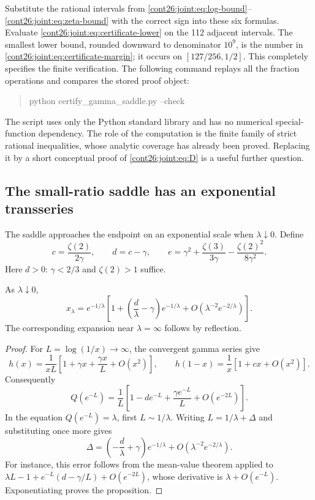 Substitute the rational intervals from
\eqref{cont26:joint:eq:log-bound}--\eqref{cont26:joint:eq:zeta-bound} with the correct
sign into these six formulas.  Evaluate
\eqref{cont26:joint:eq:certificate-lower} on the 112 adjacent intervals.
The smallest lower bound, rounded downward to denominator $10^9$,
is the number in \eqref{cont26:joint:eq:certificate-margin}; it occurs on
$[127/256,1/2]$.  This completely specifies the finite verification.
The following command replays all the fraction operations and compares
the stored proof object:
\begin{quote}\ttfamily
 python certify\_gamma\_saddle.py --check
\end{quote}
The script uses only the Python standard library and has no numerical
special-function dependency.  The role of the computation is the
finite family of strict rational inequalities, whose analytic coverage
has already been proved.  Replacing it by a short conceptual proof of
\eqref{cont26:joint:eq:D} is a useful further question.

\subsection{The small-ratio saddle has an exponential transseries}

The saddle approaches the endpoint on an exponential scale when
$\lambda\downarrow0$.  Define
\begin{equation}\label{cont26:joint:eq:cde}
 c=\frac{\zeta(2)}{2\gamma},\qquad d=c-\gamma,\qquad
 e=\gamma^2+\frac{\zeta(3)}{3\gamma}
                   -\frac{\zeta(2)^2}{8\gamma^2}.
\end{equation}
Here $d>0$: $\gamma<2/3$ and $\zeta(2)>1$ suffice.

\begin{proposition}
\label{cont26:joint:prop:saddle-small}
As $\lambda\downarrow0$,
\begin{equation}\label{cont26:joint:eq:saddle-small}
 x_\lambda=e^{-1/\lambda}
 \left[1+\left(\frac d\lambda-\gamma\right)e^{-1/\lambda}
 +O\left(\lambda^{-2}e^{-2/\lambda}\right)\right].
\end{equation}
The corresponding expansion near $\lambda=\infty$ follows by reflection.
\end{proposition}
\begin{proof}
For $L=\log(1/x)\to\infty$, the convergent gamma series give
\[
 h(x)=\frac1{xL}\left[1+\gamma x+\frac{\gamma x}L+O(x^2)\right],
 \qquad h(1-x)=\frac1x[1+cx+O(x^2)].
\]
Consequently
\[
 Q(e^{-L})=\frac1L\left[1-de^{-L}
                      +\frac{\gamma e^{-L}}L+O(e^{-2L})\right].
\]
In the equation $Q(e^{-L})=\lambda$, first $L\sim1/\lambda$.
Writing $L=1/\lambda+\Delta$ and substituting once more gives
\[
 \Delta=\left(-\frac d\lambda+\gamma\right)e^{-1/\lambda}
          +O(\lambda^{-2}e^{-2/\lambda}).
\]
For instance, this error follows from the mean-value theorem applied
to $\lambda L-1+e^{-L}(d-\gamma/L)+O(e^{-2L})$, whose derivative
is $\lambda+O(e^{-L})$.  Exponentiating proves the proposition.
\end{proof}

